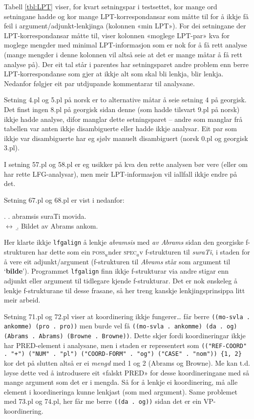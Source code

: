\documentclass[11pt,a4paper,oneside,draft]{book}
\newcommand{\F}[2]{\textsc{#1}\ensuremath{_{#2}}}
\newcommand{\p}[1]{`\textbf{#1}'}
\begin{document}
Tabell \ref{tbl:LPT} viser, for kvart setningspar i testsettet, kor
mange ord setningane hadde og kor mange LPT-korrespondansar som måtte
til for å ikkje få feil i argument/adjunkt-lenkjinga (kolonnen «min
LPT»). For dei setningane der LPT-korrespondansar måtte til, viser
kolonnen «moglege LPT-par» kva for moglege mengder med minimal
LPT-informasjon som er nok for å få rett analyse (mange mengder i
denne kolonnen vil altså seie at det er mange måtar å få rett analyse
på).  Der eit tal står i parentes har setningsparet andre problem enn
berre LPT-korrespondanse som gjer at ikkje alt som skal bli lenkja,
blir lenkja. Nedanfor følgjer eit par utdjupande kommentarar til
analysane.

Setning 4.pl og 5.pl på norsk er to alternative måtar å seie setning 4
på georgisk. Det finst ingen 8.pl på georgisk sidan denne (som hadde
tilsvart 9.pl på norsk) ikkje hadde analyse, difor manglar dette
setningsparet -- andre som manglar frå tabellen var anten ikkje
disambiguerte eller hadde ikkje analysar. Eit par som ikkje var
disambiguerte har eg sjølv manuelt disambiguert (norsk 0.pl og
georgisk 3.pl).

I setning 57.pl og 58.pl er eg usikker på kva den rette analysen bør
vere (eller om har rette LFG-analysar), men meir LPT-informasjon vil
iallfall ikkje endre på det.

Setning 67.pl og 68.pl er vist i \Next nedanfor:

\ex. \a. abramsis suraTi movida.\\
     $\leftrightarrow$
     \b. Bildet av Abrams ankom.

Her klarte ikkje \texttt{lfgalign} å lenkje \emph{abramsis} med \emph{av Abrams} sidan
den georgiske f-strukturen har dette som ein \F{poss} under \F{spec}
av f-strukturen til \emph{suraTi}, i staden for å vere eit
adjunkt/argument (f-strukturen til \emph{Abrams} står som argument til
\p{bilde}). Programmet \texttt{lfgalign} finn ikkje f-strukturar via andre
stigar enn adjunkt eller argument til tidlegare kjende
f-strukturar. Det er nok ønskeleg å lenkje f-strukturane til desse
frasane, så her treng kanskje lenkjingsprinsippa litt meir arbeid.



Setning 71.pl og 72.pl viser at koordinering ikkje fungerer\ldots{} får
berre \texttt{((mo-svla . ankomme) (pro . pro))} men burde vel få \texttt{((mo-svla . ankomme) (da . og) (Abrams . Abrams) (Browne . Browne))}.  Dette
skjer fordi koordineringar ikkje har PRED-element i analysane, men i
staden er representert som \texttt{(("REF-COORD" . "+") ("NUM" . "pl") ("COORD-FORM" . "og") ("CASE" . "nom")) \{1, 2\}} kor det på slutten
altså er ei \emph{mengd} med 1 og 2 (Abrams og Browne). Me kan t.d. løyse
dette ved å introdusere eit «falskt PRED» for desse koordineringane
med så mange argument som det er i mengda. Så for å lenkje ei
koordinering, må alle element i koordineringa kunne lenkjast (som med
argument). Same problemet med 73.pl og 74.pl, her får me berre \texttt{((da . og))} sidan det er ein VP-koordinering.
\end{document}
